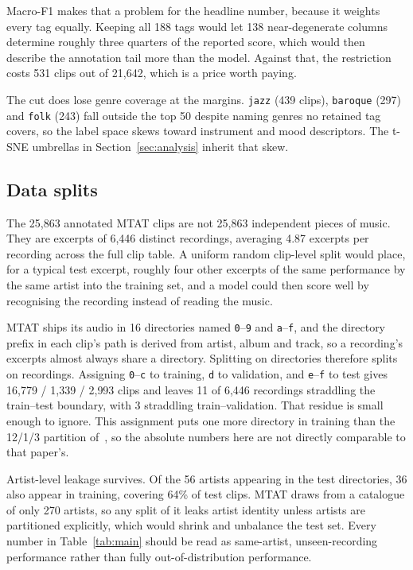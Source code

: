 \documentclass{article}
\begin{document}
Macro-F1 makes that a problem for the headline number, because it weights every
tag equally. Keeping all 188 tags would let 138 near-degenerate columns
determine roughly three quarters of the reported score, which would then
describe the annotation tail more than the model. Against that, the restriction
costs 531 clips out of 21{,}642, which is a price worth paying.

The cut does lose genre coverage at the margins. \texttt{jazz} (439 clips),
\texttt{baroque} (297) and \texttt{folk} (243) fall outside the top 50 despite
naming genres no retained tag covers, so the label space skews toward instrument
and mood descriptors. The t-SNE umbrellas in Section~\ref{sec:analysis} inherit
that skew.

\subsection{Data splits}
\label{sec:split}
The 25{,}863 annotated MTAT clips are not 25{,}863 independent pieces of music.
They are excerpts of 6{,}446 distinct recordings, averaging 4.87 excerpts per
recording across the full clip table. A uniform random clip-level split would
place, for a typical test excerpt, roughly four other excerpts of the same
performance by the same artist into the training set, and a model could then
score well by recognising the recording instead of reading the music.

MTAT ships its audio in 16 directories named \texttt{0}--\texttt{9} and
\texttt{a}--\texttt{f}, and the directory prefix in each clip's path is derived
from artist, album and track, so a recording's excerpts almost always share a
directory. Splitting on directories therefore splits on recordings. Assigning
\texttt{0}--\texttt{c} to training, \texttt{d} to validation, and
\texttt{e}--\texttt{f} to test gives 16{,}779 / 1{,}339 / 2{,}993 clips and
leaves 11 of 6{,}446 recordings straddling the train--test boundary, with 3
straddling train--validation. That residue is small enough to ignore. This
assignment puts one more directory in training than the 12/1/3 partition
of~\cite{won2020evaluation}, so the absolute numbers here are not directly
comparable to that paper's.

Artist-level leakage survives. Of the 56 artists appearing in the test
directories, 36 also appear in training, covering 64\% of test clips. MTAT
draws from a catalogue of only 270 artists, so any split of it leaks artist
identity unless artists are partitioned explicitly, which would shrink and
unbalance the test set. Every number in Table~\ref{tab:main} should be read as
same-artist, unseen-recording performance rather than fully
out-of-distribution performance.
\end{document}
